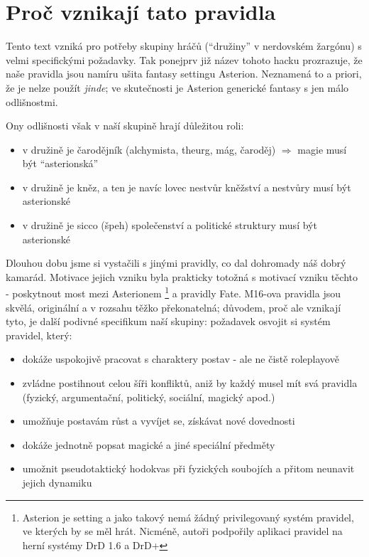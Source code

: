 \documentclass[../main.tex]{subfiles}
\begin{document}
\section{Proč vznikají tato pravidla}
\label{sec:proc-pravidla}


Tento text vzniká pro potřeby skupiny hráčů (``družiny'' v nerdovském žargónu) s velmi specifickými požadavky. Tak ponejprv již název tohoto hacku prozrazuje, že naše pravidla jsou namíru ušita fantasy settingu Asterion. Neznamená to a priori, že je nelze použít \textit{jinde}; ve skutečnosti je Asterion generické fantasy s jen málo odlišnostmi. 

Ony odlišnosti však v naší skupině hrají důležitou roli:

\begin{itemize}
\item v družině je čarodějník (alchymista, theurg, mág, čaroděj) $\Rightarrow$ magie musí být ``asterionská''
\item v družině je kněz, a ten je navíc lovec nestvůr \Rightarrow kněžství a nestvůry musí být asterionské
\item v družině je sicco (špeh) \Rightarrow společenství a politické struktury musí být asterionské
\end{itemize}

Dlouhou dobu jsme si vystačili s jinými pravidly, co dal dohromady náš dobrý kamarád. Motivace jejich vzniku byla prakticky totožná s motivací vzniku těchto - poskytnout most mezi Asterionem \footnote{Asterion je setting a jako takový nemá žádný privilegovaný systém pravidel, ve kterých by se měl hrát. Nicméně, autoři podpořily aplikaci pravidel na herní systémy DrD 1.6 a DrD+} a pravidly Fate. M16-ova pravidla jsou skvělá, originální a v rozsahu těžko překonatelná; důvodem, proč ale vznikají tyto, je další podivné specifikum naší skupiny: požadavek osvojit si systém pravidel, který:

\begin{itemize}
\item dokáže uspokojivě pracovat s charaktery postav - ale ne čistě roleplayově
\item zvládne postihnout celou šíři konfliktů, aniž by každý musel mít svá pravidla (fyzický, argumentační, politický, sociální, magický apod.)
\item umožňuje postavám růst a vyvíjet se, získávat nové dovednosti
\item dokáže jednotně popsat magické a jiné speciální předměty
\item umožnit pseudotaktický hodokvas při fyzických soubojích a přitom neunavit jejich dynamiku
\end{itemize}
\end{document}
